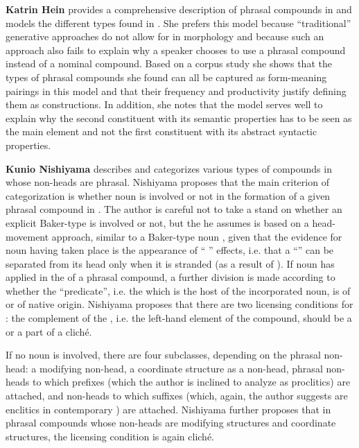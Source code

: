 \documentclass[output=paper]{LSP/langsci}
\begin{document}
\textbf{Katrin Hein} provides a comprehensive description of phrasal
compounds in  and models the different types found in
. She prefers this model because ``traditional''
generative approaches do not allow for  in morphology and
because such an approach also fails to explain why a speaker chooses
to use a phrasal compound instead of a nominal compound. Based on a
corpus study she shows that the types of phrasal compounds she found
can all be captured as form-meaning pairings in this model and that
their frequency and productivity justify defining them as
constructions. In addition, she notes that the model serves well to
explain why the second constituent with its semantic properties has to
be seen as the main element and not the first constituent with its
abstract syntactic properties. 


\textbf{Kunio Nishiyama} describes and categorizes various types of
compounds in  whose non-heads are phrasal. Nishiyama proposes
that the main criterion of categorization is whether noun
 is involved or not in the formation of a given phrasal
compound in . The author is careful not to take a stand on
whether an explicit Baker-type  is involved or not, but
the  he assumes is based on a head-movement approach,
similar to a Baker-type noun , given that the evidence
for noun  having taken place is the appearance of
`` '' effects, i.e. that a ``'' can be separated
from its head only when it is stranded (as a result of
). If noun  has applied in the  of
a phrasal compound, a further division is made according to whether
the ``predicate'', i.e. the  which is the host of the
incorporated noun, is of  or of native origin. Nishiyama
proposes that there are two licensing conditions for 
: the complement of the , i.e. the left-hand
element of the compound, should be a  or a part of a
cliché.

If no noun  is involved, there are four subclasses,
depending on the phrasal non-head: a modifying non-head, a coordinate
structure as a non-head, phrasal non-heads to which prefixes (which
the author is inclined to analyze as proclitics) are attached, and
non-heads to which suffixes (which, again, the author suggests are
enclitics in contemporary ) are attached. Nishiyama further
proposes that in phrasal compounds whose non-heads are modifying
structures and coordinate structures, the licensing condition is again
cliché.
\end{document}
